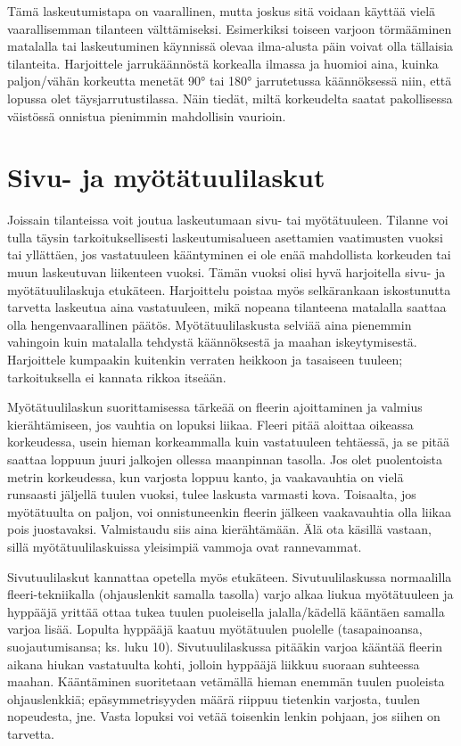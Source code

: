Tämä laskeutumistapa on vaarallinen, mutta joskus sitä voidaan käyttää vielä vaarallisemman tilanteen välttämiseksi. Esimerkiksi toiseen varjoon törmääminen matalalla tai laskeutuminen käynnissä olevaa ilma-alusta päin voivat olla tällaisia tilanteita. Harjoittele jarrukäännöstä korkealla ilmassa ja huomioi aina, kuinka paljon/vähän korkeutta menetät 90° tai 180° jarrutetussa käännöksessä niin, että lopussa olet täysjarrutustilassa. Näin tiedät, miltä korkeudelta saatat pakollisessa väistössä onnistua pienimmin mahdollisin vaurioin. 

\section{ Sivu- ja myötätuulilaskut }
\label{laskeutumistekniikat-sivu-ja-myotatuulilaskut}


Joissain tilanteissa voit joutua laskeutumaan sivu- tai myötätuuleen. Tilanne voi tulla täysin tarkoituksellisesti laskeutumisalueen asettamien vaatimusten vuoksi tai yllättäen, jos vastatuuleen kääntyminen ei ole enää mahdollista korkeuden tai muun laskeutuvan liikenteen vuoksi. Tämän vuoksi olisi hyvä harjoitella sivu- ja myötätuulilaskuja etukäteen. Harjoittelu poistaa myös selkärankaan iskostunutta tarvetta laskeutua aina vastatuuleen, mikä nopeana tilanteena matalalla saattaa olla hengenvaarallinen päätös. Myötätuulilaskusta selviää aina pienemmin vahingoin kuin matalalla tehdystä käännöksestä ja maahan iskeytymisestä. Harjoittele kumpaakin kuitenkin verraten heikkoon ja tasaiseen tuuleen; tarkoituksella ei kannata rikkoa itseään. 


Myötätuulilaskun suorittamisessa tärkeää on fleerin ajoittaminen ja valmius kierähtämiseen, jos vauhtia on lopuksi liikaa. Fleeri pitää aloittaa oikeassa korkeudessa, usein hieman korkeammalla kuin vastatuuleen tehtäessä, ja se pitää saattaa loppuun juuri jalkojen ollessa maanpinnan tasolla. Jos olet puolentoista metrin korkeudessa, kun varjosta loppuu kanto, ja vaakavauhtia on vielä runsaasti jäljellä tuulen vuoksi, tulee laskusta varmasti kova. Toisaalta, jos myötätuulta on paljon, voi onnistuneenkin fleerin jälkeen vaakavauhtia olla liikaa pois juostavaksi. Valmistaudu siis aina kierähtämään. Älä ota käsillä vastaan, sillä myötätuulilaskuissa yleisimpiä vammoja ovat rannevammat. 


Sivutuulilaskut kannattaa opetella myös etukäteen. Sivutuulilaskussa normaalilla fleeri-tekniikalla (ohjauslenkit samalla tasolla) varjo alkaa liukua myötätuuleen ja hyppääjä yrittää ottaa tukea tuulen puoleisella jalalla/kädellä kääntäen samalla varjoa lisää. Lopulta hyppääjä kaatuu myötätuulen puolelle (tasapainoansa, suojautumisansa; ks. luku 10). Sivutuulilaskussa pitääkin varjoa kääntää fleerin aikana hiukan vastatuulta kohti, jolloin hyppääjä liikkuu suoraan suhteessa maahan. Kääntäminen suoritetaan vetämällä hieman enemmän tuulen puoleista ohjauslenkkiä; epäsymmetrisyyden määrä riippuu tietenkin varjosta, tuulen nopeudesta, jne. Vasta lopuksi voi vetää toisenkin lenkin pohjaan, jos siihen on tarvetta. 

